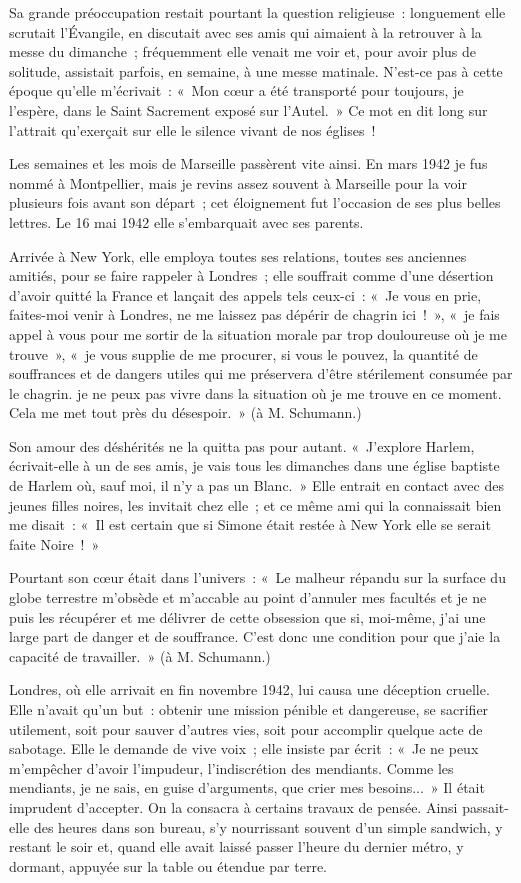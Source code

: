 \documentclass[french,twoside]{book} %
\begin{document}
Sa grande préoccupation restait pourtant la question religieuse : longuement elle scrutait l'Évangile, en discutait avec ses amis qui aimaient à la retrouver à la messe du dimanche ; fréquemment elle venait me voir et, pour avoir plus de solitude, assistait parfois, en semaine, à une messe matinale. N'est-ce pas à cette époque qu'elle m'écrivait : « Mon cœur a été transporté pour toujours, je l'espère, dans le Saint Sacrement exposé sur l'Autel. » Ce mot en dit long sur l'attrait qu'exerçait sur elle le silence vivant de nos églises !\par
Les semaines et les mois de Marseille passèrent vite ainsi. En mars 1942 je fus nommé à Montpellier, mais je revins assez souvent à Marseille pour la voir plusieurs fois avant son départ ; cet éloignement fut l'occasion de ses plus belles lettres. Le 16 mai 1942 elle s'embarquait avec ses parents.\par
Arrivée à New York, elle employa toutes ses relations, toutes ses anciennes amitiés, pour se faire rappeler à Londres ; elle souffrait comme d'une désertion d'avoir quitté la France et lançait des appels tels ceux-ci : « Je vous en prie, faites-moi venir à Londres, ne me laissez pas dépérir de chagrin ici ! », « je fais appel à vous pour me sortir de la situation morale par trop douloureuse où je me trouve », « je vous supplie de me procurer, si vous le pouvez, la quantité de souffrances et de dangers utiles qui me préservera d'être stérilement consumée par le chagrin. je ne peux pas vivre dans la situation où je me trouve en ce moment. Cela me met tout près du désespoir. » (à M. Schumann.)\par
Son amour des déshérités ne la quitta pas pour autant. « J'explore Harlem, écrivait-elle à un de ses amis, je vais tous les dimanches dans une église baptiste de Harlem où, sauf moi, il n'y a pas un Blanc. » Elle entrait en contact avec des jeunes filles noires, les invitait chez elle ; et ce même ami qui la connaissait bien me disait : « Il est certain que si Simone était restée à New York elle se serait faite Noire ! »\par
Pourtant son cœur était dans l'univers : « Le malheur répandu sur la surface du globe terrestre m'obsède et m'accable au point d'annuler mes facultés et je ne puis les récupérer et me délivrer de cette obsession que si, moi-même, j'ai une large part de danger et de souffrance. C'est donc une condition pour que j'aie la capacité de travailler. » (à M. Schumann.)\par
Londres, où elle arrivait en fin novembre 1942, lui causa une déception cruelle. Elle n'avait qu'un but : obtenir une mission pénible et dangereuse, se sacrifier utilement, soit pour sauver d'autres vies, soit pour accomplir quelque acte de sabotage. Elle le demande de vive voix ; elle insiste par écrit : « Je ne peux m'empêcher d'avoir l'impudeur, l'indiscrétion des mendiants. Comme les mendiants, je ne sais, en guise d'arguments, que crier mes besoins... » Il était imprudent d'accepter. On la consacra à certains travaux de pensée. Ainsi passait-elle des heures dans son bureau, s'y nourrissant souvent d'un simple sandwich, y restant le soir et, quand elle avait laissé passer l'heure du dernier métro, y dormant, appuyée sur la table ou étendue par terre.\par
\end{document}
